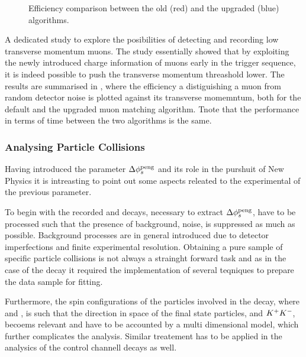 \begin{figure}[t]
  \begin{subfigure}{0.5\textwidth}
    \raggedright
    \scalebox{.6}{}
    \label{app_eff_pt_zoom_comp}
  \end{subfigure}%
  \hfill
  \begin{subfigure}{0.5\textwidth}
    \raggedleft
    \scalebox{.6}{}
    \label{app_eff_p_comp}
  \end{subfigure}
    \caption{Efficiency comparison between the old (red) and the upgraded (blue) algorithms.}
  \label{app_eff_comp}
\end{figure}

A dedicated study to explore the posibilities of detecting and recording low transverse momentum
muons. The study essentially showed that by exploiting the newly introduced charge information of
muons early in the trigger sequence, it is indeed possible to push the transverse momentum
threashold lower. The results are summarised in , where the efficiency
a distiguishing a muon from random detector noise is plotted against its transverse momemntum,
both for the default and the upgraded muon matching algorithm. Tnote that the performance in
terms of time between the two algorithms is the same.


\subsubsection{Analysing Particle Collisions}
Having introduced the parameter $\Delta\phi_{s}^{\tiny\text{peng}}$ and its role in the purshuit of New Physics
it is intreasting to point out some aspects releated to the experimental of the previous parameter.

To begin with the recorded \BsJpsiKst and \BsJpsiRho decays, necessary to extract $\Delta\phi_{s}^{\tiny\text{peng}}$,
have to be processed such that the presence of background, noise, is suppressed as much as possible.
Background processes are in general introduced due to detector imperfections and finite experimental
resolution. Obtaining a pure sample of specific particle collisions is not always a strainght forward
task and as in the case of the \BsJpsiKst decay it required the implementation of several teqniques to
prepare the data sample for fitting.

Furthermore, the spin configurations of the particles involved in the \BsJpsiPhi decay, where
\Jpsimumu and \phiKK, is such that the direction in space of the final state particles, \mumu
and $K^+K^-$, becoems relevant and have to be accounted by a multi dimensional model, which further
complicates the analysis. Similar treatement has to be applied in the analysics of the control
channell decays as well.

